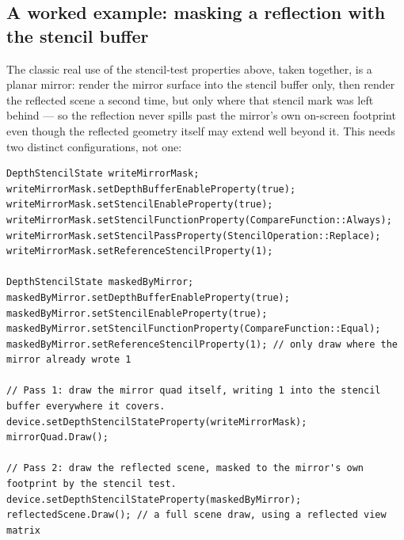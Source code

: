 \subsection{A worked example: masking a reflection with the stencil buffer}

The classic real use of the stencil-test properties above, taken together, is a planar mirror:
render the mirror surface into the stencil buffer only, then render the reflected scene a
second time, but only where that stencil mark was left behind --- so the reflection never
spills past the mirror's own on-screen footprint even though the reflected geometry itself may
extend well beyond it. This needs two distinct  configurations, not
one:

\begin{lstlisting}
DepthStencilState writeMirrorMask;
writeMirrorMask.setDepthBufferEnableProperty(true);
writeMirrorMask.setStencilEnableProperty(true);
writeMirrorMask.setStencilFunctionProperty(CompareFunction::Always);
writeMirrorMask.setStencilPassProperty(StencilOperation::Replace);
writeMirrorMask.setReferenceStencilProperty(1);

DepthStencilState maskedByMirror;
maskedByMirror.setDepthBufferEnableProperty(true);
maskedByMirror.setStencilEnableProperty(true);
maskedByMirror.setStencilFunctionProperty(CompareFunction::Equal);
maskedByMirror.setReferenceStencilProperty(1); // only draw where the mirror already wrote 1

// Pass 1: draw the mirror quad itself, writing 1 into the stencil buffer everywhere it covers.
device.setDepthStencilStateProperty(writeMirrorMask);
mirrorQuad.Draw();

// Pass 2: draw the reflected scene, masked to the mirror's own footprint by the stencil test.
device.setDepthStencilStateProperty(maskedByMirror);
reflectedScene.Draw(); // a full scene draw, using a reflected view matrix
\end{lstlisting}

